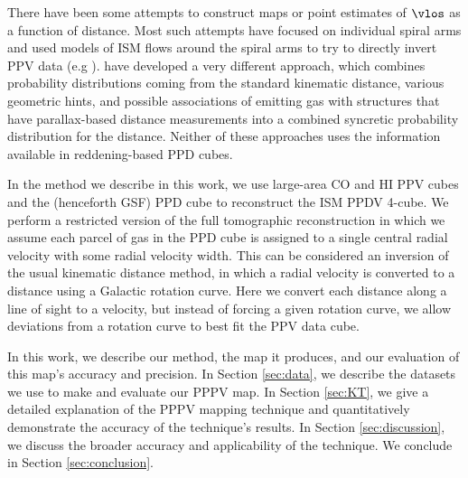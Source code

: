 There have been some attempts to construct maps or point estimates of $\vlos$ as a function of distance. 
Most such attempts have focused on individual spiral arms and used models of ISM flows around the spiral arms to try to directly invert PPV data (e.g  \citealt{1972A&A....16..118S,Foster_2006}).
\citet{Reid_2016} have developed a very different approach, which combines probability distributions coming from the standard kinematic distance, various geometric hints, and possible associations of emitting gas with structures that have parallax-based distance measurements into a combined syncretic probability distribution for the distance. 
Neither of these approaches uses the information available in reddening-based PPD cubes. 

In the method we describe in this work, we use large-area CO and HI PPV cubes and the \citet{Green_2015} (henceforth GSF) PPD cube to reconstruct the ISM PPDV 4-cube. We perform a restricted version of the full tomographic reconstruction in which we assume each parcel of gas in the PPD cube is assigned to a single central radial velocity with some radial velocity width. This can be considered an inversion of the usual kinematic distance method, in which a radial velocity is converted to a distance using a Galactic rotation curve. Here we convert each distance along a line of sight to a velocity, but instead of forcing a given rotation curve, we allow deviations from a rotation curve to best fit the PPV data cube.

In this work, we describe our method, the map it produces, and our evaluation of this map's accuracy and precision.
In Section \ref{sec:data}, we describe the datasets we use to make and evaluate our PPPV map.
In Section \ref{sec:KT}, we give a detailed explanation of the PPPV mapping technique and quantitatively demonstrate the accuracy of the technique's results.
In Section \ref{sec:discussion}, we discuss the broader accuracy and applicability of the technique.
We conclude in Section \ref{sec:conclusion}.
